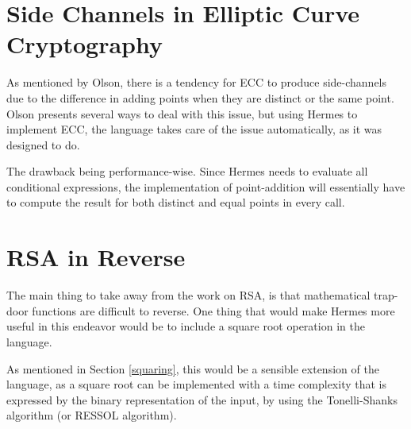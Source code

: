 \section{Side Channels in Elliptic Curve Cryptography}
As mentioned by Olson\cite{ECCSideChannels}, there is a tendency for ECC to produce side-channels due to the difference in adding points when they are distinct or the same point. Olson presents several ways to deal with this issue, but using Hermes to implement ECC, the language takes care of the issue automatically, as it was designed to do.

The drawback being performance-wise. Since Hermes needs to evaluate all conditional expressions, the implementation of point-addition will essentially have to compute the result for both distinct and equal points in every call. 

\section{RSA in Reverse}
The main thing to take away from the work on RSA, is that mathematical trap-door functions are difficult to reverse. One thing that would make Hermes more useful in this endeavor would be to include a square root operation in the language.

As mentioned in Section \ref{squaring}, this would be a sensible extension of the language, as a square root can be implemented with a time complexity that is expressed by the binary representation of the input, by using the Tonelli-Shanks algorithm (or RESSOL algorithm). 